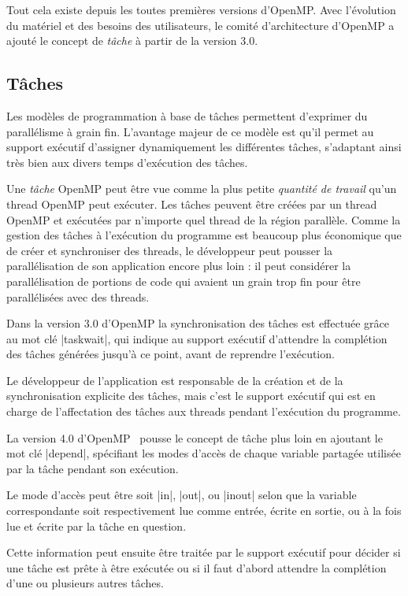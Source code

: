 Tout cela existe depuis les toutes premières versions d'OpenMP.
Avec l'évolution du matériel et des besoins des utilisateurs, le comité d'architecture d'OpenMP a ajouté le concept de \emph{tâche} à partir de la version 3.0.



\subsection{Tâches}

Les modèles de programmation à base de tâches permettent d'exprimer du parallélisme à grain fin. L'avantage majeur de ce modèle est qu'il permet au support exécutif d'assigner dynamiquement les différentes tâches, s'adaptant ainsi très bien aux divers temps d'exécution des tâches.

Une \emph{tâche} OpenMP peut être vue comme la plus petite \emph{quantité de travail} qu'un thread OpenMP peut exécuter.
Les tâches peuvent être créées par un thread OpenMP et exécutées par n'importe quel thread de la région parallèle.
Comme la gestion des tâches à l'exécution du programme est beaucoup plus économique que de créer et synchroniser des threads, le développeur peut pousser la parallélisation de son application encore plus loin : il peut considérer la parallélisation de portions de code qui avaient un grain trop fin pour être parallélisées avec des threads.

Dans la version 3.0 d'OpenMP la synchronisation des tâches est effectuée grâce au mot clé |taskwait|, qui indique au support exécutif d'attendre la complétion des tâches générées jusqu'à ce point, avant de reprendre l'exécution.

Le développeur de l'application est responsable de la création et de la synchronisation explicite des tâches, mais c'est le support exécutif qui est en charge de l'affectation des tâches aux threads pendant l'exécution du programme.

La version 4.0 d'OpenMP~\cite{openmp40} pousse le concept de tâche plus loin en ajoutant le mot clé |depend|, spécifiant les modes d'accès de chaque variable partagée utilisée par la tâche pendant son exécution.

Le mode d'accès peut être soit |in|, |out|, ou |inout| selon que la variable correspondante soit respectivement lue comme entrée, écrite en sortie, ou à la fois lue et écrite par la tâche en question.

Cette information peut ensuite être traitée par le support exécutif pour décider si une tâche est prête à être exécutée ou si il faut d'abord attendre la complétion d'une ou plusieurs autres tâches.


